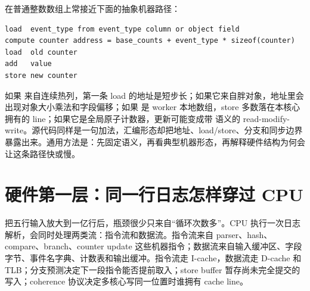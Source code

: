 在普通整数数组上常接近下面的抽象机器路径：

\begin{lstlisting}[numbers=none,caption={聚合更新的典型机器形态}]
load  event_type from event_type column or object field
compute counter address = base_counts + event_type * sizeof(counter)
load  old counter
add   value
store new counter
\end{lstlisting}

如果  来自连续热列，第一条 load 的地址是短步长；如果它来自胖对象，地址里会出现对象大小乘法和字段偏移；如果  是 worker 本地数组，store 多数落在本核心拥有的 line；如果它是全局原子计数器，更新可能变成带  语义的 read-modify-write。源代码同样是一句加法，汇编形态却把地址、load/store、分支和同步边界暴露出来。通用方法是：先固定语义，再看典型机器形态，再解释硬件结构为何会让这条路径快或慢。

\section{硬件第一层：同一行日志怎样穿过 CPU}

把五行输入放大到一亿行后，瓶颈很少只来自“循环次数多”。CPU 执行一次日志解析，会同时处理两类流：指令流和数据流。指令流来自 parser、hash、compare、branch、counter update 这些机器指令；数据流来自输入缓冲区、字段字节、事件名字典、计数表和输出缓冲。指令流走 I-cache，数据流走 D-cache 和 TLB；分支预测决定下一段指令能否提前取入；store buffer 暂存尚未完全提交的写入；coherence 协议决定多核心写同一位置时谁拥有 cache line。

